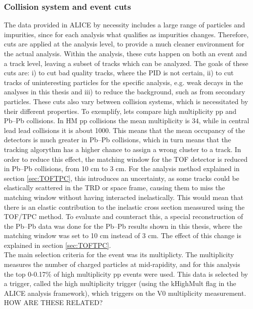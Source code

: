 \subsubsection{Collision system and event cuts}
The data provided in ALICE by necessity includes a large range of particles and impurities, since for each analysis what qualifies as impurities changes. Therefore, cuts are applied at the analysis level, to provide a much cleaner environment for the actual analysis. Within the analysis, these cuts happen on both an event and a track level, leaving a subset of tracks which can be analyzed. The goals of these cuts are: i) to cut bad quality tracks, where the PID is not certain, ii) to cut tracks of uninteresting particles for the specific analysis, e.g. weak decays in the analyses in this thesis and iii) to reduce the background, such as from secondary particles. These cuts also vary between collision systems, which is necessitated by their different properties. To exemplify, lets compare high multiplicity pp and Pb--Pb collisions. In HM pp collisions the mean multiplicity is 34, while in central lead lead collisions it is about 1000. This means that the mean occupancy of the detectors is much greater in Pb--Pb collisions, which in turn means that the tracking algorythm has a higher chance to assign a wrong cluster to a track. In order to reduce this effect, the matching window for the TOF detector is reduced in Pb--Pb collisions, from 10 cm to 3 cm. For the analysis method explained in section \ref{sec:TOFTPC}, this introduces an uncertainty, as some tracks could be elastically scattered in the TRD or space frame, causing them to miss the matching window without having interacted inelastically. This would mean that there is an elastic contribution to the inelastic cross section meassured using the TOF/TPC method. To evaluate and counteract this, a special reconstruction of the Pb--Pb data was done for the Pb--Pb results shown in this thesis, where the matching window was set to 10 cm instead of 3 cm. The effect of this change is explained in section \ref{sec:TOFTPC}. \\

The main selection criteria for the event was its multiplicty. The multiplicity measures the number of charged particles at mid-rapidity, and for this analysis the top 0-0.17\% of high multiplicity pp events were used. This data is selected by a trigger, called the high multiplicity trigger (using the kHighMult flag in the ALICE analysis framework), which triggers on the V0 multiplicity measurement. HOW ARE THESE RELATED? 

